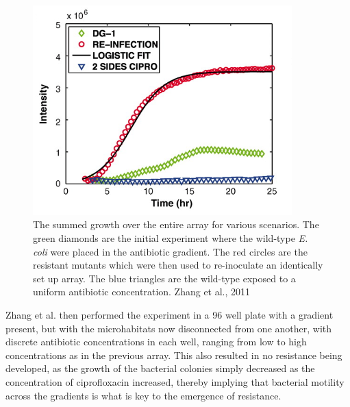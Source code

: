 \documentclass[a4paper,12pt]{article}
\begin{document}
\begin{figure}[h]
 \centering
 \includegraphics[width=10cm]{Zhang-microhab-gradient-growth-graph}
 \caption{The summed growth over the entire array for various scenarios.  The green diamonds are the initial experiment where the wild-type \textit{E. coli}
 were placed in the antibiotic gradient.  The red circles are the resistant mutants which were then used to re-inoculate an identically set up array.
 The blue triangles are the wild-type exposed to a uniform antibiotic concentration.  Zhang et al., 2011}
 \label{fig:Zhang-gradient-growth-graph}
\end{figure}


Zhang et al. then performed the experiment in a 96 well plate with a gradient present, but with the microhabitats now disconnected from one another, with discrete 
antibiotic concentrations in each well, ranging from low to high concentrations as in the previous array.  This also resulted in no resistance being developed,
as the growth of the bacterial colonies simply decreased as the concentration of ciprofloxacin increased, thereby implying that bacterial motility across the 
gradients is what is key to the emergence of resistance.  

% 
\end{document}
